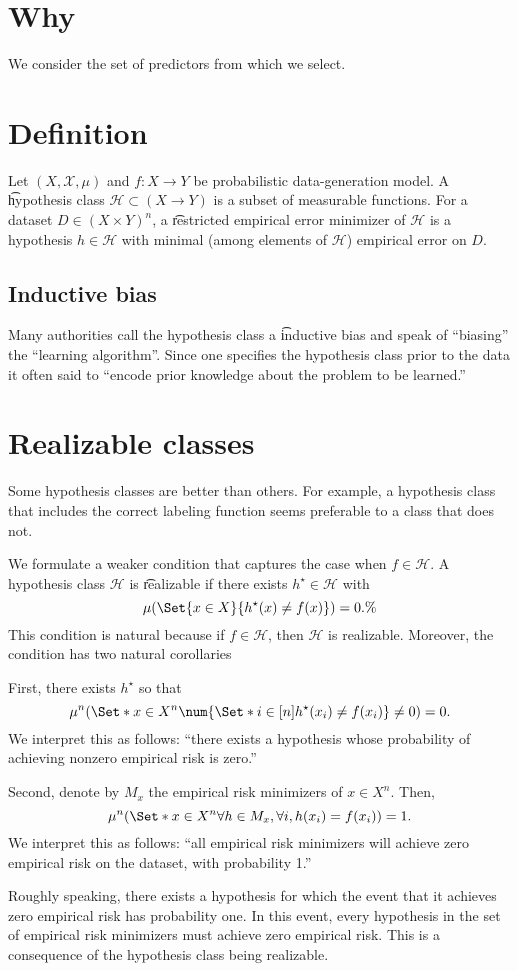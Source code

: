 
\section*{Why}

We consider the set of predictors from which we select.

\section*{Definition}

Let $(X, \mathcal{X} , \mu )$ and $f: X \to Y$ be probabilistic data-generation model.
A \t{hypothesis class} $\mathcal{H}  \subset (X \to Y)$ is a subset of measurable functions.
For a dataset $D \in (X \times  Y)^n$, a \t{restricted empirical error minimizer} of $\mathcal{H} $ is a hypothesis $h \in \mathcal{H} $ with minimal (among elements of $\mathcal{H} $) empirical error on $D$.

\subsection*{Inductive bias}

Many authorities call the hypothesis class a \t{inductive bias} and speak of ``biasing'' the ``learning algorithm''.
Since one specifies the hypothesis class prior to the data it often said to ``encode prior knowledge about the problem to be learned.''

\section*{Realizable classes}

Some hypothesis classes are better than others.
For example, a hypothesis class that includes the correct labeling function seems preferable to a class that does not.

We formulate a weaker condition that captures the case when $f \in \mathcal{H} $.
A hypothesis class $\mathcal{H} $ is \t{realizable} if there exists $h^{\star} \in \mathcal{H} $ with
\[
\mu (\Set{x \in X}{h^\star(x) \neq f(x)}) = 0.\%
\]
This condition is natural because if $f \in \mathcal{H} $, then $\mathcal{H} $ is realizable.
Moreover, the condition has two natural corollaries

First, there exists $h^\star$ so that
\[
\mu ^n(\Set*{x \in X^n}{\num{\Set*{i \in [n]}{h^\star(x_i) \neq f(x_i)}} \neq 0}) = 0.
\]
We interpret this as follows: ``there exists a hypothesis whose probability of achieving nonzero empirical risk is zero.''

Second, denote by $M_x$ the empirical risk minimizers of $x \in X^n$.
Then,
\[
\mu ^n(\Set*{x \in X^n}{\forall h \in M_x, \forall i, h(x_i) = f(x_i)}) = 1.
\]
We interpret this as follows: ``all empirical risk minimizers will achieve zero empirical risk on the dataset, with probability 1.''

Roughly speaking, there exists a hypothesis for which the event that it achieves zero empirical risk has probability one.
In this event, every hypothesis in the set of empirical risk minimizers must achieve zero empirical risk.
This is a consequence of the hypothesis class being realizable.

